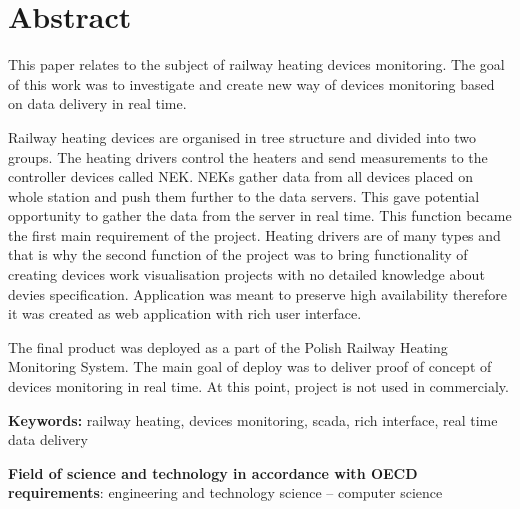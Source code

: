 \chapter*{Abstract}

This paper relates to the subject of railway heating devices monitoring. The goal of this work was to investigate and create new way of devices monitoring based on data delivery in real time.

Railway heating devices are organised in tree structure and divided into two groups. The heating drivers control the heaters and send measurements to the controller devices called NEK. NEKs gather data from all devices placed on whole station and push them further to the data servers. This gave potential opportunity to gather the data from the server in real time. This function became the first main requirement of the project. Heating drivers are of many types and that is why the second function of the project was to bring functionality of creating devices work visualisation projects with no detailed knowledge about devies specification. Application was meant to preserve high availability therefore it was created as web application with rich user interface.


The final product was deployed as a part of the Polish Railway Heating Monitoring System. The main goal of deploy was to deliver proof of concept of devices monitoring in real time. At this point, project is not used in commercialy.


\vspace{12pt}
\noindent\textbf{Keywords:} railway heating, devices monitoring, scada, rich interface, real time data delivery

\vspace{12pt}
\noindent\textbf{Field of science and technology in accordance with OECD requirements}: engineering and technology science – computer science